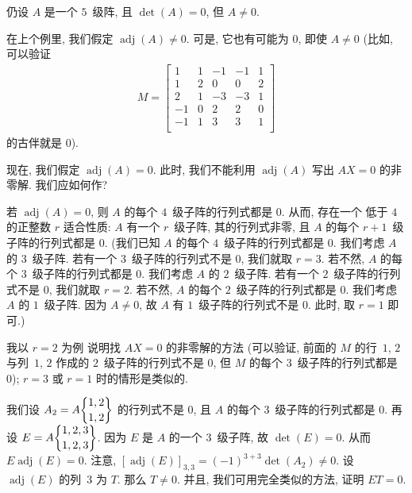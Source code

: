 \documentclass[../libro.tex]{subfiles}
\begin{document}
\begin{example}
    仍设 \(A\) 是一个 \(5\)~级阵,
    且 \(\det {(A)} = 0\),
    但 \(A \neq 0\).

    在上个例里, 我们假定
    \(\operatorname{adj} {(A)} \neq 0\).
    可是, 它也有可能为 \(0\), 即使 \(A \neq 0\)
    (比如, 可以验证 %
    \begin{align*}
        M =
        \begin{bmatrix}
            1  & 1 & -1 & -1 & 1 \\
            1  & 2 & 0  & 0  & 2 \\
            2  & 1 & -3 & -3 & 1 \\
            -1 & 0 & 2  & 2  & 0 \\
            -1 & 1 & 3  & 3  & 1 \\
        \end{bmatrix}
    \end{align*}
    的古伴就是 \(0\)). %

    现在, 我们假定
    \(\operatorname{adj} {(A)} = 0\).
    此时, 我们不能利用
    \(\operatorname{adj} {(A)}\)
    写出 \(AX = 0\) 的非零解.
    我们应如何作?

    若 \(\operatorname{adj} {(A)} = 0\),
    则 \(A\) 的每个 \(4\)~级子阵的行列式都是 \(0\).
    从而, 存在一个%
    低于 \(4\) 的正整数 \(r\)
    适合性质:
    \(A\) 有一个 \(r\)~级子阵, 其的行列式非零,
    且 \(A\) 的每个 \(r+1\)~级子阵的行列式都是 \(0\).
    (我们已知 \(A\) 的每个 \(4\)~级子阵的行列式都是 \(0\). %
    我们考虑 \(A\) 的 \(3\)~级子阵.
    若有一个 \(3\)~级子阵的行列式不是 \(0\),
    我们就取 \(r = 3\).
    若不然, \(A\) 的每个 \(3\)~级子阵的行列式都是 \(0\).
    我们考虑 \(A\) 的 \(2\)~级子阵.
    若有一个 \(2\)~级子阵的行列式不是 \(0\),
    我们就取 \(r = 2\).
    若不然, \(A\) 的每个 \(2\)~级子阵的行列式都是 \(0\).
    我们考虑 \(A\) 的 \(1\)~级子阵.
    因为 \(A \neq 0\),
    故 \(A\) 有 \(1\)~级子阵的行列式不是 \(0\).
    此时, 取 \(r = 1\) 即可.) %

    我以 \(r = 2\) 为例%
    说明找 \(AX = 0\) 的非零解的方法
    (可以验证, %
    前面的 \(M\) 的行~\(1\), \(2\)
    与列~\(1\), \(2\) 作成的
    \(2\)~级子阵的行列式不是 \(0\),
    但 \(M\) 的每个 \(3\)~级子阵的行列式都是 \(0\)); %
    \(r = 3\) 或 \(r = 1\) 时的情形是类似的.

    我们设
    \(A_2 = A\submat{1,2}{1,2}\)
    的行列式不是 \(0\),
    且 \(A\) 的每个 \(3\)~级子阵的行列式都是 \(0\).
    再设
    \(E = A\submat{1,2,3}{1,2,3}\).
    因为 \(E\) 是 \(A\) 的一个 \(3\)~级子阵,
    故 \(\det {(E)} = 0\).
    从而
    \(E \operatorname{adj} {(E)} = 0\).
    注意,
    \([\operatorname{adj} {(E)}]_{3,3}
    = (-1)^{3+3} \det {(A_2)} \neq 0\).
    设 \(\operatorname{adj} {(E)}\)
    的列~\(3\) 为 \(T\).
    那么 \(T \neq 0\).
    并且, 我们可用完全类似的方法, 证明
    \(ET = 0\).


\end{example}
\end{document}
